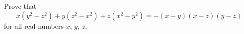 Prove that
\[
x(y^2-z^2)+y(z^2-x^2)+z(x^2-y^2)=-(x-y)(x-z)(y-z)
\]
for all real numbers $x$, $y$, $z$.
